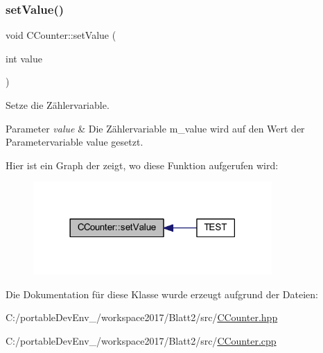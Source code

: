 \subsubsection{\texorpdfstring{set\+Value()}{setValue()}}
{\footnotesize\ttfamily void C\+Counter\+::set\+Value (\begin{DoxyParamCaption}\item[{int}]{value }\end{DoxyParamCaption})}

Setze die Zählervariable. 
\begin{DoxyParams}{Parameter}
{\em value} & Die Zählervariable m\+\_\+value wird auf den Wert der Parametervariable value gesetzt. \\
\hline
\end{DoxyParams}
Hier ist ein Graph der zeigt, wo diese Funktion aufgerufen wird\+:
\nopagebreak
\begin{figure}[H]
\begin{center}
\leavevmode
\includegraphics[width=258pt]{class_c_counter_ac41245afdd95c0149e99bad21696a372_icgraph}
\end{center}
\end{figure}


Die Dokumentation für diese Klasse wurde erzeugt aufgrund der Dateien\+:\begin{DoxyCompactItemize}
\item 
C\+:/portable\+Dev\+Env\+\_/workspace2017/\+Blatt2/src/\hyperlink{_c_counter_8hpp}{C\+Counter.\+hpp}\item 
C\+:/portable\+Dev\+Env\+\_/workspace2017/\+Blatt2/src/\hyperlink{_c_counter_8cpp}{C\+Counter.\+cpp}\end{DoxyCompactItemize}

